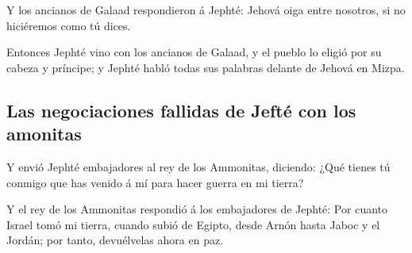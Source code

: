  Y los ancianos de Galaad respondieron á Jephté: Jehová
oiga entre nosotros, si no hiciéremos como tú dices.

 Entonces Jephté vino con los ancianos de Galaad, y el
pueblo lo eligió por su cabeza y príncipe; y Jephté habló todas sus
palabras delante de Jehová en Mizpa.

\hypertarget{las-negociaciones-fallidas-de-jeftuxe9-con-los-amonitas}{%
\subsection{Las negociaciones fallidas de Jefté con los
amonitas}\label{las-negociaciones-fallidas-de-jeftuxe9-con-los-amonitas}}

 Y envió Jephté embajadores al rey de los Ammonitas,
diciendo: ¿Qué tienes tú conmigo que has venido á mí para hacer guerra
en mi tierra?

 Y el rey de los Ammonitas respondió á los embajadores de
Jephté: Por cuanto Israel tomó mi tierra, cuando subió de Egipto, desde
Arnón hasta Jaboc y el Jordán; por tanto, devuélvelas ahora en paz.

